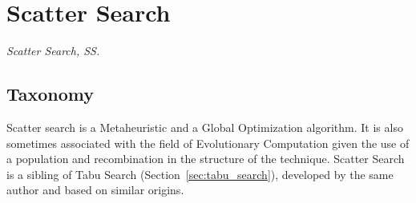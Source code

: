 

\section{Scatter Search} 
\label{sec:scatter_search}

\emph{Scatter Search, SS.}

\subsection{Taxonomy}
Scatter search is a Metaheuristic and a Global Optimization algorithm. It is also sometimes associated with the field of Evolutionary Computation given the use of a population and recombination in the structure of the technique.
Scatter Search is a sibling of Tabu Search (Section~\ref{sec:tabu_search}), developed by the same author and based on similar origins.

